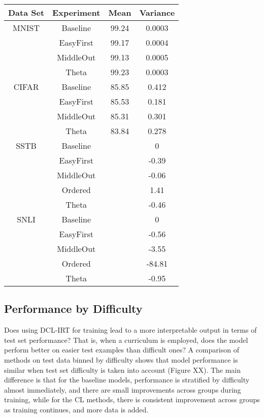 \documentclass[letterpaper]{article} %
\begin{document}
\begin{table*}[h!]
	\centering 
	\begin{tabular}{cccc}
		\toprule
		Data Set & Experiment & Mean & Variance \\ 
		\midrule
		MNIST & Baseline & 99.24&	0.0003
		\\
		\cmidrule{2-4}
		& EasyFirst & 99.17&	0.0004
		\\
		& MiddleOut & 99.13&	0.0005
		\\
		& Theta& 99.23&	 0.0003
		\\
		\midrule
		CIFAR & Baseline & 85.85 &	0.412
		\\
		\cmidrule{2-4}
		& EasyFirst & 85.53	&0.181
		\\
		& MiddleOut & 85.31&0.301
		\\
		& Theta &83.84& 0.278
		\\
		\midrule
		SSTB & Baseline &  &	0
		\\
		\cmidrule{2-4}
		& EasyFirst & &	-0.39
		\\
		& MiddleOut & &	-0.06
		\\
		& Ordered & &	 1.41
		\\
		& Theta &&	-0.46
		\\
		\midrule
		SNLI & Baseline & &	0
		\\
		\cmidrule{2-4}
		& EasyFirst & & 	-0.56
		\\
		& MiddleOut &&	-3.55
		\\
		& Ordered & &	-84.81
		\\
		& Theta& &	-0.95
		\\
		\bottomrule 
	\end{tabular}
	\label{tab:robustness}
\end{table*}



\subsection{Performance by Difficulty}
Does using DCL-IRT for training lead to a more interpretable output in terms of test set performance?
That is, when a curriculum is employed, does the model perform better on easier test examples than difficult ones?
A comparison of methods on test data binned by difficulty shows that model performance is similar when test set difficulty is taken into account (Figure XX).
The main difference is that for the baseline models, performance is stratified by difficulty almost immediately, and there are small improvements across groups during training, while for the CL methods, there is consistent improvement across groups as training continues, and more data is added. 
\end{document}
